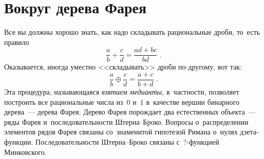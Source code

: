 
\section*{Вокруг дерева Фарея}



Все вы должны хорошо знать, как надо складывать рациональные дроби, то~есть
правило
\[
    \frac{a}{b} + \frac{c}{d}
=
    \frac{a d + b c}{b d}
\; . \]
Оказывается, иногда уместно <<складывать>> дроби по-другому, вот так:
\[
    \frac{a}{b} \oplus \frac{c}{d}
=
    \frac{a + c}{b + d}
\; . \]
Эта процедура, называющаяся \emph{взятием медианты,} в~частности, позволяет
построить все рациональные числа из~0 и~1 в~качестве вершин бинарного
дерева~--- дерева Фарея.
Дерево Фарея порождает два естественных объекта~--- ряды Фарея
и~последовательности Штерна--Броко.
Вопросы о~распределении элементов рядов Фарея связаны со~знаменитой гипотезой
Римана о~нулях дзета-функции.
Последовательности Штерна--Броко связаны с~$?$-функцией Минковского.

